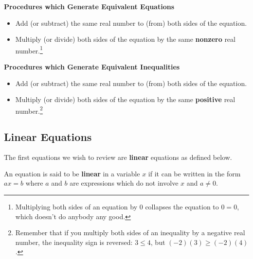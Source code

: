 \documentclass{ximera}
\begin{document}
\bigskip

 \label{equivalenteqnineq}


\centerline{\textbf{Procedures which Generate Equivalent Equations}}

\begin{itemize}

\item  Add (or subtract) the same real number to (from) both sides of the equation.

\item  Multiply (or divide) both sides of the equation by the same \textbf{nonzero} real number.\footnote{Multiplying both sides of an equation by $0$ collapses the equation to $0 = 0$, which doesn't do anybody any good.}

\end{itemize}

\centerline{\textbf{Procedures which Generate Equivalent Inequalities}}

\vspace{-0.1in}

\begin{itemize}

\item  Add (or subtract) the same real number to (from) both sides of the equation.

\item  Multiply (or divide) both sides of the equation by the same \textbf{positive} real number.\footnote{Remember that if you multiply both sides of an inequality by a negative real number, the inequality sign is reversed:  $3 \leq 4$, but $(-2)(3) \geq (-2)(4)$.}

\end{itemize}


\subsection{Linear Equations} \label{LinearEqn}

The first equations we wish to review are \textbf{linear} equations as defined below.

\medskip


\begin{definition}\label{lineareqndefn} An equation is said to be \textbf{linear} in a variable $x$ if it can be written in the form $ax = b$ where $a$ and $b$ are expressions which do not involve $x$ and $a \neq 0$.

\end{definition}
\end{document}
